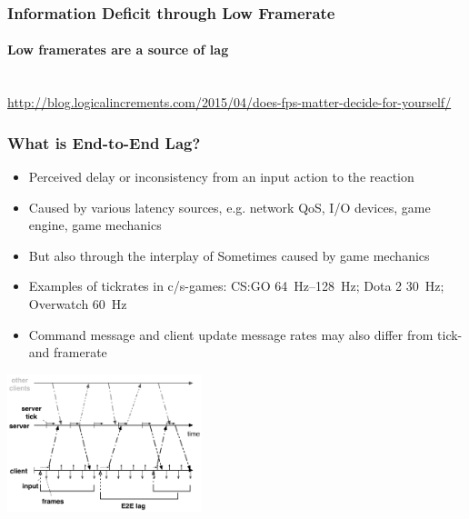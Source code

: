 \documentclass{UDEbeamerEN}
\begin{document}
\begin{frame}
	\frametitle{Information Deficit through Low Framerate}
	\framesubtitle{Low framerates are a source of lag}

	\begin{center}
		\\
		{\tiny\url{http://blog.logicalincrements.com/2015/04/does-fps-matter-decide-for-yourself/}}
	\end{center}
\end{frame}


\begin{frame}
	\frametitle{What is End-to-End Lag?}

	\begin{itemize}
		\item Perceived delay or inconsistency from an input action to the reaction
		\item Caused by various latency sources, e.g. network QoS, I/O devices, game engine, game mechanics
		\item But also through the interplay of Sometimes caused by game mechanics
		\item Examples of tickrates in c/s-games: CS:GO \SIrange{64}{128}{\hertz}; Dota 2 \SI{30}{\hertz}; Overwatch \SI{60}{\hertz}
		\item Command message and client update message rates may also differ from tick- and framerate
	\end{itemize}
		\vspace{-4mm}
		\begin{center}
		\includegraphics[height=4cm]{../../../models/tickrate-timeseries-poster.pdf}
	\end{center}

\end{frame}
\end{document}
